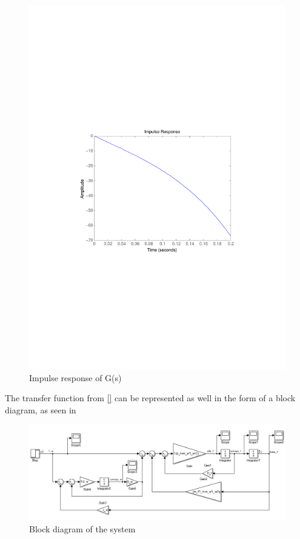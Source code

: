 \begin{figure}[H] 
	\centering 
	\includegraphics[scale=0.8]{figures/impulseResponseTF}
	\centering
	\captionsetup{justification=centering}	
	\caption{Impulse response of G(s)}
	\label{impulseCubliTF}
\end{figure}
%
The transfer function from \eqref{} can be represented as well in the form of a block diagram, as seen in 
%
\begin{figure}[H] 
	\centering 
	\includegraphics[scale=0.53]{figures/cubliSimulink}
	\centering
	\captionsetup{justification=centering}
	\caption{Block diagram of the system}
	\label{cubliSimulink}
\end{figure} 
